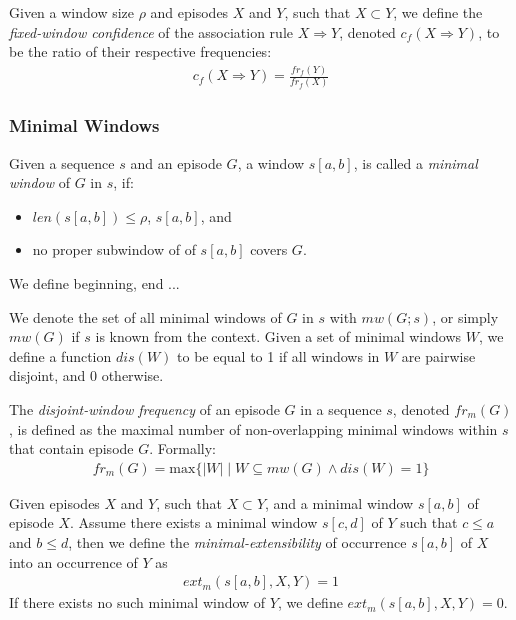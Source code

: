 \begin{definition}
Given a window size $ \rho $ and episodes $ X $ and $ Y $, such that $ X \subset Y $, we define the \emph{fixed-window confidence} of the association rule $ X \Rightarrow Y $, denoted $ c_f(X \Rightarrow Y) $, to be the ratio of their respective frequencies:
\begin{align*}
c_f(X \Rightarrow Y) = \frac{ fr_f(Y) }{ fr_f(X) }
\end{align*}
\end{definition}

\subsubsection{Minimal Windows}

\begin{definition}
Given a sequence $ s $ and an episode $ G $, a window $ s[a, b] $, is called a \emph{minimal window} of $ G $ in $ s $, if:
\begin{itemize}
\item $ len(s[a, b]) \leq \rho $, $ s[a, b] $, and
\item no proper subwindow of of $ s[a, b] $ covers $ G $.
\end{itemize}
We define beginning, end ... %

We denote the set of all minimal windows of $ G $ in $ s $ with $ mw(G; s) $, or simply $ mw(G) $ if $ s $ is known from the context. Given a set of minimal windows $ W $, we define a function $ dis(W) $ to be equal to 1 if all windows in $ W $ are pairwise disjoint, and 0 otherwise.
\end{definition}

\begin{definition}
The \emph{disjoint-window frequency} of an episode $ G $ in a sequence $ s $, denoted $ fr_m(G) $, is defined as the maximal number of non-overlapping minimal windows within $ s $ that contain episode $ G $. Formally:
\begin{align*}
fr_m(G) = \text{max} \{ | W | \mid W \subseteq mw(G) \wedge dis(W) = 1 \}
\end{align*}
\end{definition}

\begin{definition}
Given episodes $ X $ and $ Y $, such that $ X \subset Y $, and a minimal window $ s[a, b] $ of episode $ X $. Assume there exists a minimal window $ s[c, d] $ of $ Y $ such that $ c \leq a $ and $ b \leq d $, then we define the \emph{minimal-extensibility} of occurrence $ s[a, b] $ of $ X $ into an occurrence of $ Y $ as
\begin{align*}
ext_m(s[a, b], X, Y) = 1
\end{align*}
If there exists no such minimal window of $ Y $, we define $ ext_m(s[a, b], X, Y) = 0 $.
\end{definition}

